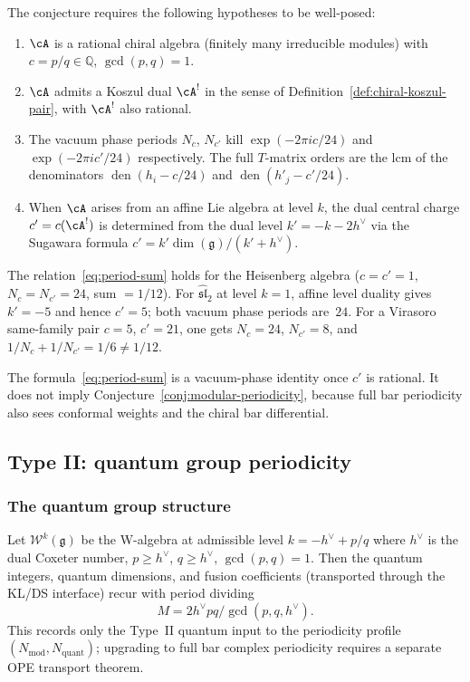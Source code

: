 \begin{remark}
\label{rem:precise-reflected-hypotheses}
The conjecture requires the following hypotheses to be well-posed:
\begin{enumerate}
\item $\cA$ is a rational chiral algebra (finitely many irreducible modules) with $c = p/q \in \mathbb{Q}$, $\gcd(p,q) = 1$.
\item $\cA$ admits a Koszul dual $\cA^!$ in the sense of Definition~\ref{def:chiral-koszul-pair}, with $\cA^!$ also rational.
\item The vacuum phase periods $N_c$, $N_{c'}$ kill
 $\exp(-2\pi i c/24)$ and $\exp(-2\pi i c'/24)$ respectively.
 The full $T$-matrix orders are the lcm of the denominators
 $\operatorname{den}(h_i-c/24)$ and
 $\operatorname{den}(h'_j-c'/24)$.
\item When $\cA$ arises from an affine Lie algebra at level $k$, the dual central charge $c' = c(\cA^!)$ is determined from the dual level $k' = -k - 2h^\vee$ via the Sugawara formula $c' = k'\dim(\mathfrak{g})/(k' + h^\vee)$.
\end{enumerate}
The relation~\eqref{eq:period-sum} holds for the Heisenberg algebra
($c=c'=1$, $N_c=N_{c'}=24$, sum $=1/12$). For
$\widehat{\mathfrak{sl}}_2$ at level $k=1$, affine level duality gives
$k'=-5$ and hence $c'=5$; both vacuum phase periods are~$24$.
For a Virasoro same-family pair $c=5$, $c'=21$, one gets
$N_c=24$, $N_{c'}=8$, and
$1/N_c+1/N_{c'}=1/6\ne1/12$.
\end{remark}

\begin{remark}[Scope]
The formula~\eqref{eq:period-sum} is a vacuum-phase identity once
$c'$ is rational. It does not imply Conjecture~\ref{conj:modular-periodicity},
because full bar periodicity also sees conformal weights and the chiral
bar differential.
\end{remark}

\subsection{Type II: quantum group periodicity}

\subsubsection{The quantum group structure}

\begin{proposition}
\label{prop:periodicity-quantum-input}
Let $\mathcal{W}^k(\mathfrak{g})$ be the W-algebra at admissible level $k = -h^{\vee} + p/q$ where $h^{\vee}$ is the dual Coxeter number, $p \geq h^\vee$, $q \geq h^\vee$, $\gcd(p,q) = 1$. Then the quantum integers, quantum dimensions, and fusion coefficients (transported through the KL/DS interface) recur with period dividing
\[
M = 2h^{\vee}pq/\gcd(p,q,h^{\vee}).
\]
This records only the Type~II quantum input to the periodicity profile $(N_{\mathrm{mod}}, N_{\mathrm{quant}})$; upgrading to full bar complex periodicity requires a separate OPE transport theorem.
\end{proposition}

